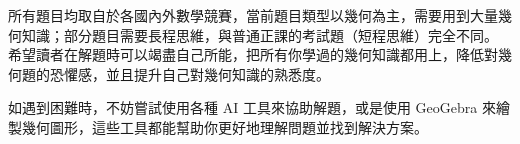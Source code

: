 所有題目均取自於各國內外數學競賽，當前題目類型以幾何為主，需要用到大量幾何知識；部分題目需要長程思維，與普通正課的考試題（短程思維）完全不同。
希望讀者在解題時可以竭盡自己所能，把所有你學過的幾何知識都用上，降低對幾何題的恐懼感，並且提升自己對幾何知識的熟悉度。

如遇到困難時，不妨嘗試使用各種 AI 工具來協助解題，或是使用 GeoGebra 來繪製幾何圖形，這些工具都能幫助你更好地理解問題並找到解決方案。